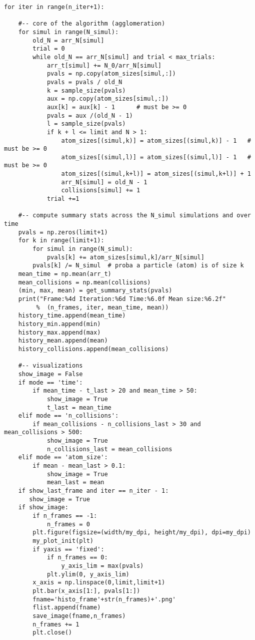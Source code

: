\documentclass[oneside,10pt]{book}
\begin{document}
\begin{lstlisting}
for iter in range(n_iter+1):

    #-- core of the algorithm (agglomeration)
    for simul in range(N_simul):
        old_N = arr_N[simul]
        trial = 0
        while old_N == arr_N[simul] and trial < max_trials:
            arr_t[simul] += N_0/arr_N[simul]
            pvals = np.copy(atom_sizes[simul,:])
            pvals = pvals / old_N
            k = sample_size(pvals)
            aux = np.copy(atom_sizes[simul,:])
            aux[k] = aux[k] - 1      # must be >= 0
            pvals = aux /(old_N - 1)
            l = sample_size(pvals)
            if k + l <= limit and N > 1:
                atom_sizes[(simul,k)] = atom_sizes[(simul,k)] - 1   # must be >= 0
                atom_sizes[(simul,l)] = atom_sizes[(simul,l)] - 1   # must be >= 0
                atom_sizes[(simul,k+l)] = atom_sizes[(simul,k+l)] + 1
                arr_N[simul] = old_N - 1
                collisions[simul] += 1
            trial +=1

    #-- compute summary stats across the N_simul simulations and over time
    pvals = np.zeros(limit+1)
    for k in range(limit+1):
        for simul in range(N_simul):
            pvals[k] += atom_sizes[simul,k]/arr_N[simul]
        pvals[k] /= N_simul  # proba a particle (atom) is of size k
    mean_time = np.mean(arr_t)
    mean_collisions = np.mean(collisions)
    (min, max, mean) = get_summary_stats(pvals)
    print("Frame:%4d Iteration:%6d Time:%6.0f Mean size:%6.2f"
         %  (n_frames, iter, mean_time, mean))
    history_time.append(mean_time)
    history_min.append(min)
    history_max.append(max)
    history_mean.append(mean)
    history_collisions.append(mean_collisions)

    #-- visualizations
    show_image = False
    if mode == 'time':
        if mean_time - t_last > 20 and mean_time > 50:
            show_image = True
            t_last = mean_time
    elif mode == 'n_collisions':
        if mean_collisions - n_collisions_last > 30 and mean_collisions > 500:
            show_image = True
            n_collisions_last = mean_collisions
    elif mode == 'atom_size':
        if mean - mean_last > 0.1:
            show_image = True
            mean_last = mean
    if show_last_frame and iter == n_iter - 1:
       show_image = True
    if show_image:
        if n_frames == -1:
            n_frames = 0
        plt.figure(figsize=(width/my_dpi, height/my_dpi), dpi=my_dpi)
        my_plot_init(plt)
        if yaxis == 'fixed':
            if n_frames == 0:
                y_axis_lim = max(pvals)
            plt.ylim(0, y_axis_lim)
        x_axis = np.linspace(0,limit,limit+1)
        plt.bar(x_axis[1:], pvals[1:])
        fname='histo_frame'+str(n_frames)+'.png'
        flist.append(fname)
        save_image(fname,n_frames)
        n_frames += 1
        plt.close()


\end{lstlisting}
\end{document}
